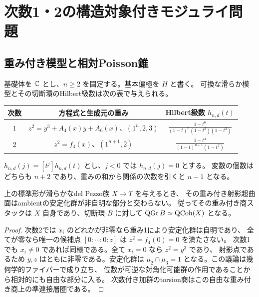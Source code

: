 \section{次数1・2の構造対象付きモジュライ問題}
\label{sec:definitions}

\subsection{重み付き模型と相対Poisson錐}
基礎体を $\mathbb C$ とし、$n\ge2$ を固定する。基本偏極を $H$ と書く。
可換な滑らか模型とその切断環のHilbert級数は次の表で与えられる。
\begin{center}
\begin{tabular}{ccc}
\toprule
次数 & 方程式と生成元の重み & Hilbert級数 $h_{n,d}(t)$\\
\midrule
$1$ & $z^2=y^3+A_4(x)y+A_6(x)$、$(1^n,2,3)$
    & $\displaystyle\frac{1-t^6}{(1-t)^n(1-t^2)(1-t^3)}$\\[5pt]
$2$ & $z^2=f_4(x)$、$(1^{n+1},2)$
    & $\displaystyle\frac{1-t^4}{(1-t)^{n+1}(1-t^2)}$\\
\bottomrule
\end{tabular}
\end{center}
$h_{n,d}(j)=[t^j]h_{n,d}(t)$ とし、$j<0$ では $h_{n,d}(j)=0$ とする。
変数の個数はどちらも $n+2$ であり、重みの和から関係の次数を引くと $n-1$ となる。

\begin{lemma}[滑らかな標準形と通常の射影スキーム]
\label{lem:weighted-free-locus}
上の標準形が滑らかなdel Pezzo族 $X\to T$ を与えるとき、
その重み付き射影超曲面はambientの安定化群が非自明な部分と交わらない。
従ってその重み付き商スタックは $X$ 自身であり、切断環 $B$ に対して
$\operatorname{QGr} B\simeq\operatorname{QCoh}(X)$ となる。
\end{lemma}
\begin{proof}
次数2では $x_i$ のどれかが非零なら重み1により安定化群は自明であり、
全てが零なら唯一の候補点 $[0:\cdots:0:z]$ は $z^2=f_4(0)=0$ を満たさない。
次数1でも $x_i\ne0$ であれば同様である。全て $x_i=0$ なら $z^2=y^3$ であり、
射影点であるため $y,z$ はともに非零である。安定化群は
$\mu_2\cap\mu_3=1$ となる。この議論は幾何学的ファイバーで成り立ち、
位数が可逆な対角化可能群の作用であることから相対的にも自由な部分に入る。
次数付き加群のtorsion商はこの自由な重み付き商上の準連接層圏である。
\end{proof}

